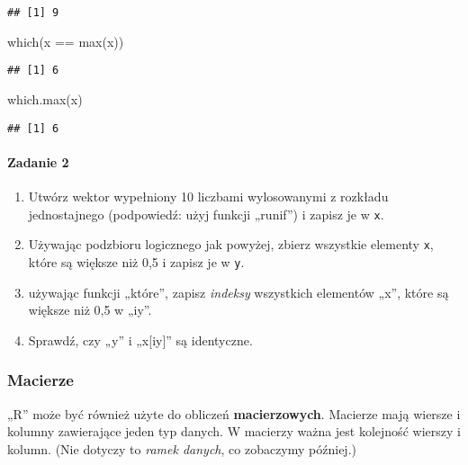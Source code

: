 \documentclass[
]{article}
\newenvironment{Shaded}{\begin{snugshade}}{\end{snugshade}}
\newcommand{\FunctionTok}[1]{\textcolor[rgb]{0.00,0.00,0.00}{#1}}
\newcommand{\NormalTok}[1]{#1}
\newcommand{\SpecialCharTok}[1]{\textcolor[rgb]{0.00,0.00,0.00}{#1}}
\providecommand{\tightlist}{%
  \setlength{\itemsep}{0pt}\setlength{\parskip}{0pt}}
\begin{document}
\begin{verbatim}
## [1] 9
\end{verbatim}

\begin{Shaded}
\begin{Highlighting}[]
\FunctionTok{which}\NormalTok{(x }\SpecialCharTok{==} \FunctionTok{max}\NormalTok{(x))}
\end{Highlighting}
\end{Shaded}

\begin{verbatim}
## [1] 6
\end{verbatim}

\begin{Shaded}
\begin{Highlighting}[]
\FunctionTok{which.max}\NormalTok{(x)}
\end{Highlighting}
\end{Shaded}

\begin{verbatim}
## [1] 6
\end{verbatim}

\hypertarget{zadanie-2}{%
\paragraph{Zadanie 2}\label{zadanie-2}}

\begin{enumerate}
\def\labelenumi{\arabic{enumi}.}
\tightlist
\item
  Utwórz wektor wypełniony 10 liczbami wylosowanymi z rozkładu
  jednostajnego (podpowiedź: użyj funkcji „runif'') i zapisz je w
  \texttt{x}.
\item
  Używając podzbioru logicznego jak powyżej, zbierz wszystkie elementy
  \texttt{x}, które są większe niż 0,5 i zapisz je w \texttt{y}.
\item
  używając funkcji „które'', zapisz \emph{indeksy} wszystkich elementów
  „x'', które są większe niż 0,5 w „iy''.
\item
  Sprawdź, czy „y'' i „x{[}iy{]}'' są identyczne.
\end{enumerate}

\hypertarget{macierze}{%
\subsubsection{Macierze}\label{macierze}}

„R'' może być również użyte do obliczeń \textbf{macierzowych}. Macierze
mają wiersze i kolumny zawierające jeden typ danych. W macierzy ważna
jest kolejność wierszy i kolumn. (Nie dotyczy to \emph{ramek danych}, co
zobaczymy później.)
\end{document}
